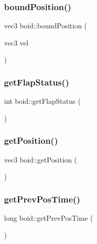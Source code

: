 \subsubsection{\texorpdfstring{bound\+Position()}{boundPosition()}}
{\footnotesize\ttfamily vec3 boid\+::bound\+Position (\begin{DoxyParamCaption}\item[{vec3}]{vel }\end{DoxyParamCaption})}

\mbox{\label{classboid_afe9b3c0b99cf7e10cfe5b3a04cebc733}} 
\subsubsection{\texorpdfstring{get\+Flap\+Status()}{getFlapStatus()}}
{\footnotesize\ttfamily int boid\+::get\+Flap\+Status (\begin{DoxyParamCaption}{ }\end{DoxyParamCaption})}

\mbox{\label{classboid_a2c5263307b1229f318c6a4adb9d9aed6}} 
\subsubsection{\texorpdfstring{get\+Position()}{getPosition()}}
{\footnotesize\ttfamily vec3 boid\+::get\+Position (\begin{DoxyParamCaption}{ }\end{DoxyParamCaption})}

\mbox{\label{classboid_ac518e9fb5d7ad104641e254d58f9ae6e}} 
\subsubsection{\texorpdfstring{get\+Prev\+Pos\+Time()}{getPrevPosTime()}}
{\footnotesize\ttfamily long boid\+::get\+Prev\+Pos\+Time (\begin{DoxyParamCaption}{ }\end{DoxyParamCaption})}

\mbox{\label{classboid_a9e4a3515298169b581618cf1fbcedcc4}} 
